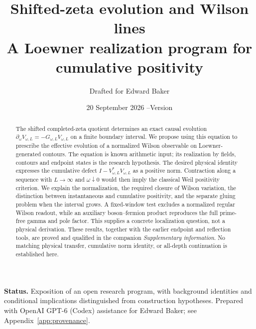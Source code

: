 \documentclass[11pt]{article}
\title{Shifted-zeta evolution and Wilson lines\\[3pt]
\large A Loewner realization program for cumulative positivity}
\author{Drafted for Edward Baker}
\date{20 September 2026 \quad--\quad Version \draftversion}
\begin{document}
\maketitle
\begin{abstract}
The shifted completed-zeta quotient determines an exact causal evolution
$\partial_\omega V_{\omega,L}=-G_{\omega,L}V_{\omega,L}$ on a finite
boundary interval. We propose using this equation to prescribe the
effective evolution of a normalized Wilson observable on
Loewner-generated contours. The equation is known arithmetic input;
its realization by fields, contours and endpoint states is the research
hypothesis. The desired physical identity expresses the cumulative
defect $I-V_{\omega,L}^*V_{\omega,L}$ as a positive norm. Contraction
along a sequence with $L\to\infty$ and $\omega\downarrow0$ would then
imply the classical Weil positivity criterion. We explain the
normalization, the required closure of Wilson variation, the distinction
between instantaneous and cumulative positivity, and the separate
gluing problem when the interval grows. A fixed-window test excludes a normalized regular Wilson readout,
while an auxiliary boson--fermion product reproduces the full
prime-free gamma and pole factor. This supplies a concrete
localization question, not a physical derivation. These results,
together with the earlier endpoint and reflection tools, are proved
and qualified in the companion \emph{Supplementary information}. No matching physical transfer,
cumulative norm identity, or all-depth continuation is established here.
\end{abstract}
\noindent\textbf{Status.} Exposition of an open research program, with
background identities and conditional implications distinguished from
construction hypotheses. Prepared with OpenAI GPT-6 (Codex) assistance
for Edward Baker; see Appendix~\ref{app:provenance}.
\tableofcontents









\appendix


\end{document}

